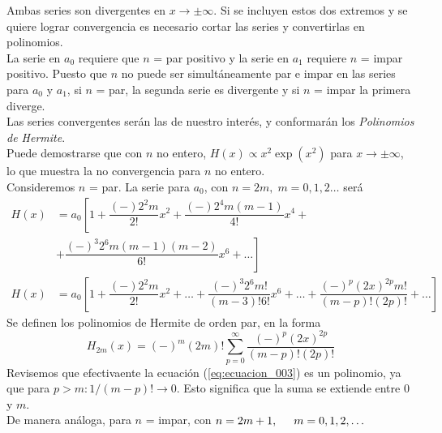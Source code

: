 Ambas series son divergentes en $x \to \pm \infty$. Si se incluyen estos dos extremos y se quiere lograr convergencia es necesario cortar las series y convertirlas en polinomios.
\\
La serie en $a_{0}$ requiere que $n$ = par positivo y la serie en $a_{1}$ requiere $n$ = impar positivo. Puesto que $n$ no puede ser simultáneamente par e impar en las series para $a_{0}$ y $a_{1}$, si $n$ = par, la segunda serie es divergente y si $n$ = impar la primera diverge.
\\
Las series convergentes serán las de nuestro interés, y conformarán los \emph{Polinomios de Hermite}.
\\
Puede demostrarse que con $n$ no entero, $H(x) \propto x^{2} \exp(x^{2})$ para $x \to \pm \infty$, lo que muestra la no convergencia para $n$ no entero.
\\
Consideremos $n$ = par. La serie para $a_{0}$, con $n=2m, \; m=0,1,2\ldots$ será
\[ \begin{split}
H(x) &= a_{0} \left[ 1 + \dfrac{(-) 2^{2} m}{2!} x^{2} + \dfrac{(-) 2^{4} m (m - 1)}{4!} x^{4} + \right. \\
&+ \left. \dfrac{(-)^{3}2^{6} m (m-1)(m-2) }{6!} x^{6} + \ldots \right] \\
H(x) &= a_{0} \left[ 1 + \dfrac{(-) 2^{2} m}{2!} x^{2} + \ldots + \dfrac{(-)^{3} 2^{6} m!}{(m-3)! 6!} x^{6} + \ldots + \dfrac{(-)^{p}(2x)^{2p} m!}{(m-p)!(2p)!} + \ldots \right]
\end{split} \]
Se definen los polinomios de Hermite de orden par, en la forma
\begin{equation}
H_{2m} (x) = (-)^{m} (2m)! \sum_{p=0}^{\infty} \dfrac{(-)^{p}(2x)^{2p}}{(m-p)!(2p)!}
\label{eq:ecuacion_003}
\end{equation}
Revisemos que efectivaente la ecuación (\ref{eq:ecuacion_003}) es un polinomio, ya que para $p > m : 1 / (m-p)! \to 0$. Esto significa que la suma se extiende entre $0$ y $m$.
\\
De manera análoga, para $n$ = impar, con $n=2m+1, \hspace{0.5cm} m=0,1,2,\ldots$

